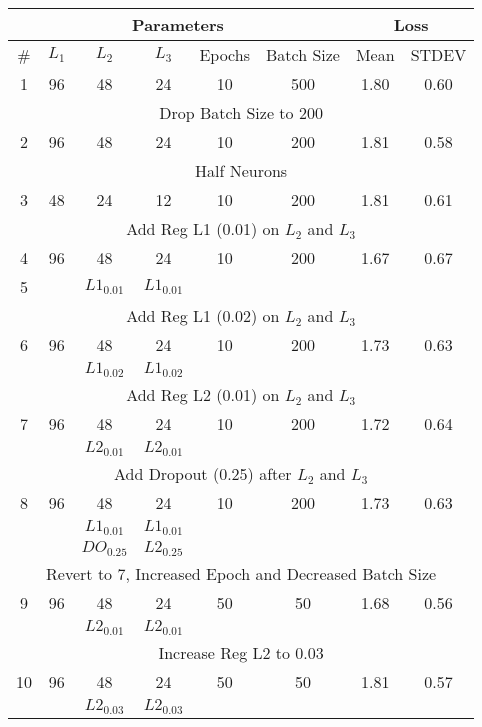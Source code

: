 \begin{tabular}{|c|c|c|c|c|c|c|c|} 
\hline
\multicolumn{6}{|c|}{Parameters} & \multicolumn{2}{|c|}{Loss}  \\
\hline
\# & $L_1$ & $L_2$ & $L_3$ & Epochs & Batch Size & Mean & STDEV \\
\hline
1 & 96 & 48 & 24 & 10 & 500 & 1.80 & 0.60 \\ \hline
\multicolumn{8}{|c|}{Drop Batch Size to 200}  \\ \hline
2 & 96 & 48 & 24 & 10 & 200 & 1.81 & 0.58 \\ \hline
\multicolumn{8}{|c|}{Half Neurons}  \\ \hline
3 & 48 & 24 & 12 & 10 & 200 & 1.81 & 0.61 \\ \hline
\multicolumn{8}{|c|}{Add Reg L1 (0.01) on $L_2$ and $L_3$}  \\ \hline
4 & 96 & 48 & 24 & 10 & 200 & 1.67 & 0.67  \\ \hline
5 & {} & $L1_{0.01}$ & $L1_{0.01}$ & {} & {} & {} & {} \\ \hline
\multicolumn{8}{|c|}{Add Reg L1 (0.02) on $L_2$ and $L_3$}  \\ \hline
6 & 96 & 48 & 24 & 10 & 200 & 1.73 & 0.63  \\ \hline
{} & {} & $L1_{0.02}$ & $L1_{0.02}$ & {} & {} & {} & {} \\ \hline
\multicolumn{8}{|c|}{Add Reg L2 (0.01) on $L_2$ and $L_3$}  \\ \hline
7 & 96 & 48 & 24 & 10 & 200 & 1.72 & 0.64  \\ \hline
{} & {} & $L2_{0.01}$ & $L2_{0.01}$ & {} & {} & {} & {} \\ \hline
\multicolumn{8}{|c|}{Add Dropout (0.25) after $L_2$ and $L_3$}  \\ \hline
8 & 96 & 48 & 24 & 10 & 200 & 1.73 & 0.63  \\ \hline
{} & {} & $L1_{0.01}$ & $L1_{0.01}$ & {} & {} & {} & {} \\ \hline
{} & {} & $DO_{0.25}$ & $L2_{0.25}$ & {} & {} & {} & {} \\ \hline
\multicolumn{8}{|c|}{Revert to 7, Increased Epoch and Decreased Batch Size}  \\ \hline
9 & 96 & 48 & 24 & 50 & 50 & 1.68 & 0.56  \\ \hline
{} & {} & $L2_{0.01}$ & $L2_{0.01}$ & {} & {} & {} & {} \\ \hline
\multicolumn{8}{|c|}{Increase Reg L2 to 0.03}  \\ \hline
10 & 96 & 48 & 24 & 50 & 50 & 1.81 & 0.57  \\ \hline
{} & {} & $L2_{0.03}$ & $L2_{0.03}$ & {} & {} & {} & {} \\ \hline
\end{tabular}	



